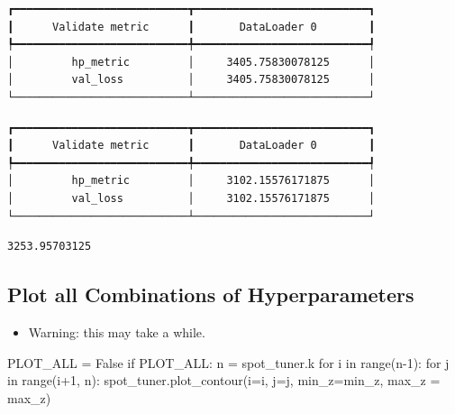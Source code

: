 \documentclass[
  letterpaper,
  DIV=11,
  numbers=noendperiod]{scrreprt}
\newenvironment{Shaded}{\begin{snugshade}}{\end{snugshade}}
\newcommand{\BuiltInTok}[1]{\textcolor[rgb]{0.00,0.23,0.31}{#1}}
\newcommand{\ControlFlowTok}[1]{\textcolor[rgb]{0.00,0.23,0.31}{#1}}
\newcommand{\DecValTok}[1]{\textcolor[rgb]{0.68,0.00,0.00}{#1}}
\newcommand{\KeywordTok}[1]{\textcolor[rgb]{0.00,0.23,0.31}{#1}}
\newcommand{\NormalTok}[1]{\textcolor[rgb]{0.00,0.23,0.31}{#1}}
\newcommand{\OperatorTok}[1]{\textcolor[rgb]{0.37,0.37,0.37}{#1}}
\newcommand{\VariableTok}[1]{\textcolor[rgb]{0.07,0.07,0.07}{#1}}
\providecommand{\tightlist}{%
  \setlength{\itemsep}{0pt}\setlength{\parskip}{0pt}}\usepackage{longtable,booktabs,array}
\begin{document}
\begin{verbatim}
┏━━━━━━━━━━━━━━━━━━━━━━━━━━━┳━━━━━━━━━━━━━━━━━━━━━━━━━━━┓
┃      Validate metric      ┃       DataLoader 0        ┃
┡━━━━━━━━━━━━━━━━━━━━━━━━━━━╇━━━━━━━━━━━━━━━━━━━━━━━━━━━┩
│         hp_metric         │     3405.75830078125      │
│         val_loss          │     3405.75830078125      │
└───────────────────────────┴───────────────────────────┘
\end{verbatim}

\begin{verbatim}
┏━━━━━━━━━━━━━━━━━━━━━━━━━━━┳━━━━━━━━━━━━━━━━━━━━━━━━━━━┓
┃      Validate metric      ┃       DataLoader 0        ┃
┡━━━━━━━━━━━━━━━━━━━━━━━━━━━╇━━━━━━━━━━━━━━━━━━━━━━━━━━━┩
│         hp_metric         │     3102.15576171875      │
│         val_loss          │     3102.15576171875      │
└───────────────────────────┴───────────────────────────┘
\end{verbatim}

\begin{verbatim}
3253.95703125
\end{verbatim}

\subsection{Plot all Combinations of
Hyperparameters}\label{plot-all-combinations-of-hyperparameters-1}

\begin{itemize}
\tightlist
\item
  Warning: this may take a while.
\end{itemize}

\begin{Shaded}
\begin{Highlighting}[]
\NormalTok{PLOT\_ALL }\OperatorTok{=} \VariableTok{False}
\ControlFlowTok{if}\NormalTok{ PLOT\_ALL:}
\NormalTok{    n }\OperatorTok{=}\NormalTok{ spot\_tuner.k}
    \ControlFlowTok{for}\NormalTok{ i }\KeywordTok{in} \BuiltInTok{range}\NormalTok{(n}\OperatorTok{{-}}\DecValTok{1}\NormalTok{):}
        \ControlFlowTok{for}\NormalTok{ j }\KeywordTok{in} \BuiltInTok{range}\NormalTok{(i}\OperatorTok{+}\DecValTok{1}\NormalTok{, n):}
\NormalTok{            spot\_tuner.plot\_contour(i}\OperatorTok{=}\NormalTok{i, j}\OperatorTok{=}\NormalTok{j, min\_z}\OperatorTok{=}\NormalTok{min\_z, max\_z }\OperatorTok{=}\NormalTok{ max\_z)}
\end{Highlighting}
\end{Shaded}
\end{document}
